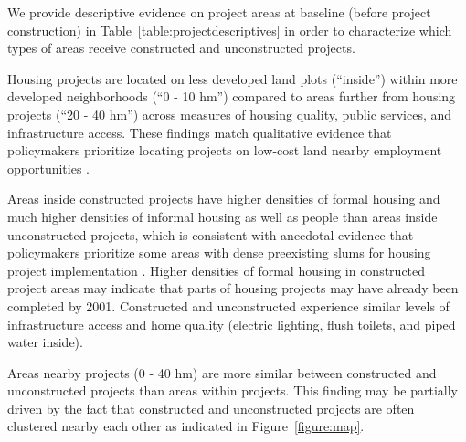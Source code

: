 \documentclass[12pt]{article}
\begin{document}
We provide descriptive evidence on project areas at baseline (before project construction) in Table~\ref{table:projectdescriptives} in order to characterize which types of areas receive constructed and unconstructed projects.

Housing projects are located on less developed land plots (``inside'') within more developed neighborhoods (``0 - 10 hm'') compared to areas further from housing projects (``20 - 40 hm'') across measures of housing quality, public services, and infrastructure access.  These findings match qualitative evidence that policymakers prioritize locating projects on low-cost land nearby employment opportunities \citep{beninterview}.

Areas inside constructed projects have higher densities of formal housing and much higher densities of informal housing as well as people than areas inside unconstructed projects, which is consistent with anecdotal evidence that policymakers prioritize some areas with dense preexisting slums for housing project implementation \citep{hofmeyr2008risk}.  Higher densities of formal housing in constructed project areas may indicate that parts of housing projects may have already been completed by 2001.  Constructed and unconstructed experience similar levels of infrastructure access and home quality (electric lighting, flush toilets, and piped water inside).  

Areas nearby projects (0 - 40 hm) are more similar between constructed and unconstructed projects than areas within projects.  This finding may be partially driven by the fact that constructed and unconstructed projects are often clustered nearby each other as indicated in Figure~\ref{figure:map}.



\end{document}
